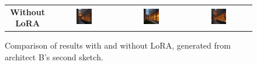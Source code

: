 \begin{figure}[H]
{\begin{tabular}{c c c c}
    \textbf{Without LoRA} &
    \includegraphics[width=0.25\textwidth]{Images/Results/Architect-B_unstructured-phase/generated_images/2/Zonder_lora_00004_.png} &
    \includegraphics[width=0.25\textwidth]{Images/Results/Architect-B_unstructured-phase/generated_images/2/Zonder_lora_00005_.png} & \includegraphics[width=0.25\textwidth]{Images/Results/Architect-B_unstructured-phase/generated_images/2/Zonder_lora_00007_.png} \\
  \end{tabular}
  }
  \caption{Comparison of results with and without LoRA, generated from architect B's second sketch.}
  \label{fig:lora-comparison-2wide}
\end{figure}


